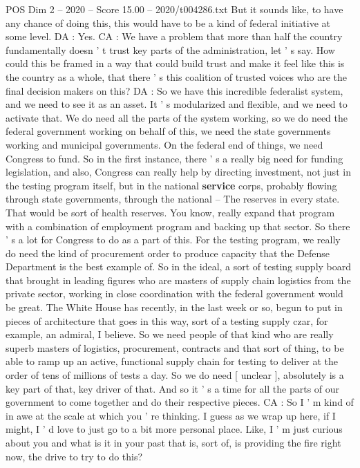 \begin{textsample}{POS Dim 2 – 2020 – Score 15.00 – 2020/t004286.txt}
But it sounds like, to have any chance of doing this, this would have to be a kind of federal initiative at some level.
DA : Yes.
CA : We have a problem that more than half the country fundamentally doesn ' t trust key parts of the administration, let ' s say.
How could this be framed in a way that could build trust and make it feel like this is the country as a whole, that there ' s this coalition of trusted voices who are the final decision makers on this?
DA : So we have this incredible federalist system, and we need to see it as an asset.
It ' s modularized and flexible, and we need to activate that.
We do need all the parts of the system working, so we do need the federal government working on behalf of this, we need the state governments working and municipal governments.
On the federal end of things, we need Congress to fund.
So in the first instance, there ' s a really big need for funding legislation, and also, Congress can really help by directing investment, not just in the testing program itself, but in the national \textbf{service} corps, probably flowing through state governments, through the national -- The reserves in every state.
That would be sort of health reserves.
You know, really expand that program with a combination of employment program and backing up that sector.
So there ' s a lot for Congress to do as a part of this.
For the testing program, we really do need the kind of procurement order to produce capacity that the Defense Department is the best example of.
So in the ideal, a sort of testing supply board that brought in leading figures who are masters of supply chain logistics from the private sector, working in close coordination with the federal government would be great.
The White House has recently, in the last week or so, begun to put in pieces of architecture that goes in this way, sort of a testing supply czar, for example, an admiral, I believe.
So we need people of that kind who are really superb masters of logistics, procurement, contracts and that sort of thing, to be able to ramp up an active, functional supply chain for testing to deliver at the order of tens of millions of tests a day.
So we do need [ unclear ], absolutely is a key part of that, key driver of that.
And so it ' s a time for all the parts of our government to come together and do their respective pieces.
CA : So I ' m kind of in awe at the scale at which you ' re thinking.
I guess as we wrap up here, if I might, I ' d love to just go to a bit more personal place.
Like, I ' m just curious about you and what is it in your past that is, sort of, is providing the fire right now, the drive to try to do this?

\end{textsample}
